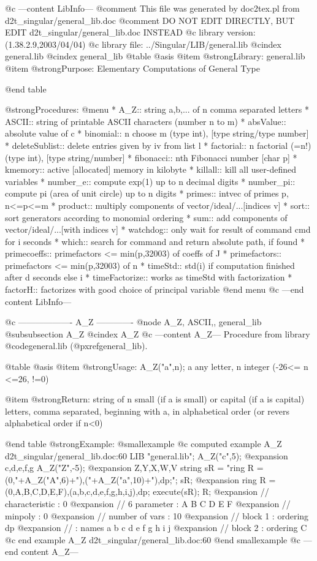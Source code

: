 @c ---content LibInfo---
@comment This file was generated by doc2tex.pl from d2t_singular/general_lib.doc
@comment DO NOT EDIT DIRECTLY, BUT EDIT d2t_singular/general_lib.doc INSTEAD
@c library version: (1.38.2.9,2003/04/04)
@c library file: ../Singular/LIB/general.lib
@cindex general.lib
@cindex general_lib
@table @asis
@item @strong{Library:}
general.lib
@item @strong{Purpose:}
   Elementary Computations of General Type

@end table

@strong{Procedures:}
@menu
* A_Z:: string a,b,... of n comma separated letters
* ASCII:: string of printable ASCII characters (number n to m)
* absValue:: absolute value of c
* binomial:: n choose m (type int), [type string/type number]
* deleteSublist:: delete entries given by iv from list l
* factorial:: n factorial (=n!) (type int), [type string/number]
* fibonacci:: nth Fibonacci number [char p]
* kmemory:: active [allocated] memory in kilobyte
* killall:: kill all user-defined variables
* number_e:: compute exp(1) up to n decimal digits
* number_pi:: compute pi (area of unit circle) up to n digits
* primes:: intvec of primes p, n<=p<=m
* product:: multiply components of vector/ideal/...[indices v]
* sort:: sort generators according to monomial ordering
* sum:: add components of vector/ideal/...[with indices v]
* watchdog:: only wait for result of command cmd for i seconds
* which:: search for command and return absolute path, if found
* primecoeffs:: primefactors <= min(p,32003) of coeffs of J
* primefactors:: primefactors <= min(p,32003) of n
* timeStd:: std(i) if computation finished after d seconds else i
* timeFactorize:: works as timeStd with factorization
* factorH:: factorizes with good choice of principal variable
@end menu
@c ---end content LibInfo---

@c ------------------- A_Z -------------
@node A_Z, ASCII,, general_lib
@subsubsection A_Z
@cindex A_Z
@c ---content A_Z---
Procedure from library @code{general.lib} (@pxref{general_lib}).

@table @asis
@item @strong{Usage:}
A_Z("a",n); a any letter, n integer (-26<= n <=26, !=0)

@item @strong{Return:}
string of n small (if a is small) or capital (if a is capital)
letters, comma separated, beginning with a, in alphabetical
order (or revers alphabetical order if n<0)

@end table
@strong{Example:}
@smallexample
@c computed example A_Z d2t_singular/general_lib.doc:60 
LIB "general.lib";
A_Z("c",5);
@expansion{} c,d,e,f,g
A_Z("Z",-5);
@expansion{} Z,Y,X,W,V
string sR = "ring R = (0,"+A_Z("A",6)+"),("+A_Z("a",10)+"),dp;";
sR;
@expansion{} ring R = (0,A,B,C,D,E,F),(a,b,c,d,e,f,g,h,i,j),dp;
execute(sR);
R;
@expansion{} //   characteristic : 0
@expansion{} //   6 parameter    : A B C D E F 
@expansion{} //   minpoly        : 0
@expansion{} //   number of vars : 10
@expansion{} //        block   1 : ordering dp
@expansion{} //                  : names    a b c d e f g h i j 
@expansion{} //        block   2 : ordering C
@c end example A_Z d2t_singular/general_lib.doc:60
@end smallexample
@c ---end content A_Z---

